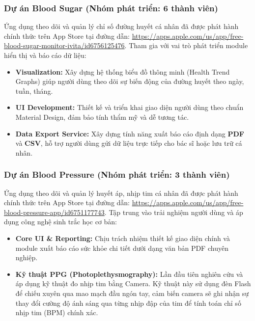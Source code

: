 \documentclass[12pt, a4paper]{article}
\begin{document}
\subsubsection{Dự án Blood Sugar (Nhóm phát triển: 6 thành viên)}
Ứng dụng theo dõi và quản lý chỉ số đường huyết cá nhân đã được phát hành chính thức trên App Store tại đường dẫn: \url{https://apps.apple.com/us/app/free-blood-sugar-monitor-ivita/id6756125476}.
Tham gia với vai trò phát triển module hiển thị và báo cáo dữ liệu:
\begin{itemize}
    \item \textbf{Visualization:} Xây dựng hệ thống biểu đồ thông minh (Health Trend Graphs) giúp người dùng theo dõi sự biến động của đường huyết theo ngày, tuần, tháng.
    \item \textbf{UI Development:} Thiết kế và triển khai giao diện người dùng theo chuẩn Material Design, đảm bảo tính thẩm mỹ và dễ tương tác.
    \item \textbf{Data Export Service:} Xây dựng tính năng xuất báo cáo định dạng \textbf{PDF} và \textbf{CSV}, hỗ trợ người dùng gửi dữ liệu trực tiếp cho bác sĩ hoặc lưu trữ cá nhân.
\end{itemize}

\subsubsection{Dự án Blood Pressure (Nhóm phát triển: 3 thành viên)}
Ứng dụng theo dõi và quản lý huyết áp, nhịp tim cá nhân đã được phát hành chính thức trên App Store tại đường dẫn: \url{https://apps.apple.com/us/app/free-blood-pressure-app/id6751177743}.
Tập trung vào trải nghiệm người dùng và áp dụng công nghệ sinh trắc học cơ bản:
\begin{itemize}
    \item \textbf{Core UI \& Reporting:} Chịu trách nhiệm thiết kế giao diện chính và module xuất báo cáo sức khỏe chi tiết dưới dạng văn bản PDF chuyên nghiệp.
    \item \textbf{Kỹ thuật PPG (Photoplethysmography):} Lần đầu tiên nghiên cứu và áp dụng kỹ thuật đo nhịp tim bằng Camera. Kỹ thuật này sử dụng đèn Flash để chiếu xuyên qua mao mạch đầu ngón tay, cảm biến camera sẽ ghi nhận sự thay đổi cường độ ánh sáng qua từng nhịp đập của tim để tính toán chỉ số nhịp tim (BPM) chính xác.
\end{itemize}
\end{document}
